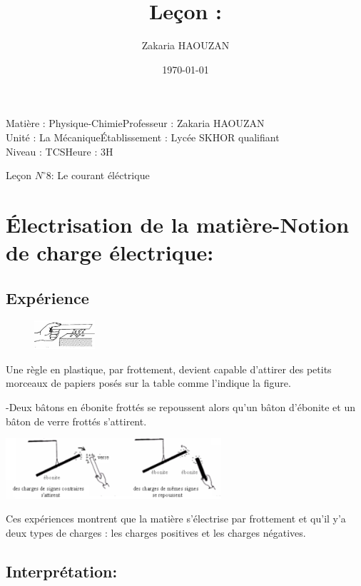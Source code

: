 \documentclass[12pt]{article}
\title{Leçon : }
\author{Zakaria HAOUZAN}
\date{\today}
\newcommand\headerMe[2]{\noindent{}#1\hfill#2}
\begin{document}
\headerMe{Matière : Physique-Chimie}{Professeur : Zakaria HAOUZAN}\\
\headerMe{Unité : La Mécanique}{Établissement : Lycée SKHOR qualifiant}\\
\headerMe{Niveau : TCS}{Heure : 3H}\\

\begin{center}
    \Large{Leçon $N^{\circ}8$: \color{red} Le courant éléctrique}
\end{center}

\section{ Électrisation de la matière-Notion de charge électrique: }
\subsection{Expérience}

\begin{figure}
\includegraphics[width=0.2\textwidth]{./img/img_00.png}
\end{figure}


Une règle en plastique, par frottement, devient capable d'attirer des petits morceaux de papiers posés sur la table comme
l'indique la figure.

-Deux bâtons en ébonite frottés se repoussent alors qu'un bâton d'ébonite et un bâton de verre frottés s'attirent.
\begin{center}
\includegraphics[width=0.6\textwidth]{./img/img_01.png}
\end{center}
Ces expériences montrent que la matière s'électrise par frottement et qu'il y'a deux types de charges : les charges
positives et les charges négatives.
\subsection{Interprétation:}
\end{document}
